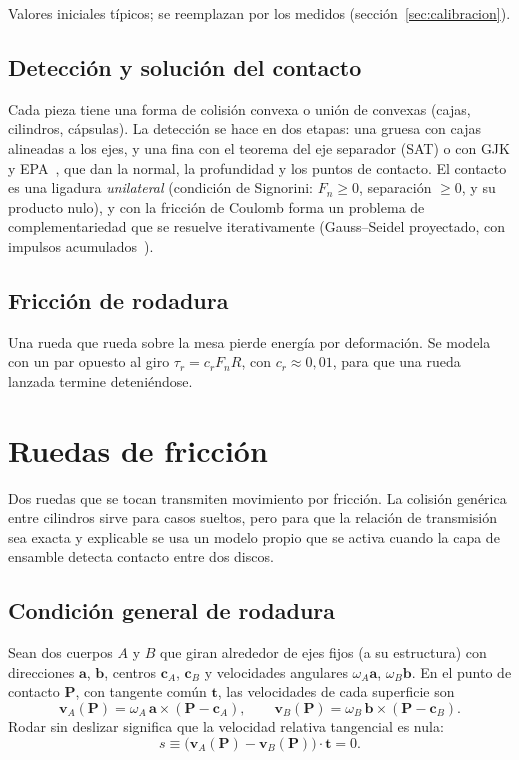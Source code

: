 \documentclass[11pt,a4paper]{article}
\numberwithin{equation}{section}
\newcommand{\vect}[1]{\bm{#1}}
\begin{document}
\smallskip
{\small Valores iniciales típicos; se reemplazan por los medidos (sección~\ref{sec:calibracion}).}

\subsection{Detección y solución del contacto}
Cada pieza tiene una forma de colisión convexa o unión de convexas (cajas, cilindros, cápsulas). La detección se hace
en dos etapas: una gruesa con cajas alineadas a los ejes, y una fina con el teorema del eje separador (SAT) o con
GJK y EPA~\cite{ericson, vandenbergen}, que dan la normal, la profundidad y los puntos de contacto. El contacto es una
ligadura \emph{unilateral} (condición de Signorini: $F_n\ge0$, separación $\ge0$, y su producto nulo), y con la
fricción de Coulomb forma un problema de complementariedad que se resuelve iterativamente (Gauss–Seidel proyectado,
con impulsos acumulados~\cite{catto, stewart-trinkle}).

\subsection{Fricción de rodadura}
Una rueda que rueda sobre la mesa pierde energía por deformación. Se modela con un par opuesto al giro
$\tau_r = c_r F_n R$, con $c_r \approx 0{,}01$, para que una rueda lanzada termine deteniéndose.

\section{Ruedas de fricción}

Dos ruedas que se tocan transmiten movimiento por fricción. La colisión genérica entre cilindros sirve
para casos sueltos, pero para que la relación de transmisión sea exacta y explicable se usa un modelo propio que se
activa cuando la capa de ensamble detecta contacto entre dos discos.

\subsection{Condición general de rodadura}
Sean dos cuerpos $A$ y $B$ que giran alrededor de ejes fijos (a su estructura) con direcciones $\vect{a}$, $\vect{b}$,
centros $\vect{c}_A$, $\vect{c}_B$ y velocidades angulares $\omega_A\vect{a}$, $\omega_B\vect{b}$. En el punto de
contacto $\vect{P}$, con tangente común $\vect{t}$, las velocidades de cada superficie son
\begin{equation}
  \vect{v}_A(\vect{P}) = \omega_A\,\vect{a}\times(\vect{P}-\vect{c}_A), \qquad
  \vect{v}_B(\vect{P}) = \omega_B\,\vect{b}\times(\vect{P}-\vect{c}_B).
\end{equation}
Rodar sin deslizar significa que la velocidad relativa tangencial es nula:
\begin{equation}
  s \equiv \bigl(\vect{v}_A(\vect{P}) - \vect{v}_B(\vect{P})\bigr)\cdot\vect{t} = 0 .
\end{equation}
\end{document}
